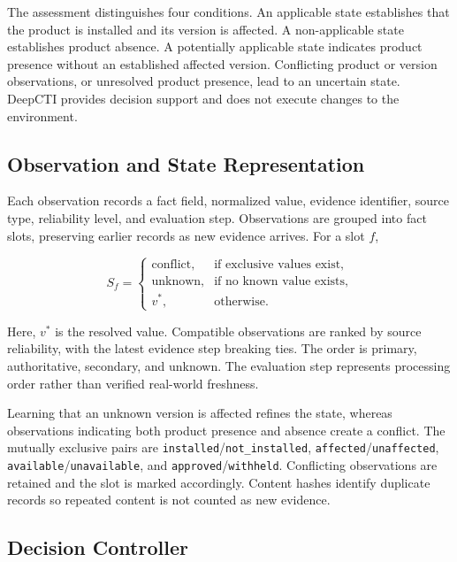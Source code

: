 \documentclass[conference]{IEEEtran}
\begin{document}
The assessment distinguishes four conditions. An applicable state
establishes that the product is installed and its version is affected.
A non-applicable state establishes product absence. A potentially
applicable state indicates product presence without an established
affected version. Conflicting product or version observations, or
unresolved product presence, lead to an uncertain state. DeepCTI
provides decision support and does not execute changes to the environment.

\subsection{Observation and State Representation}

Each observation records a fact field, normalized value, evidence
identifier, source type, reliability level, and evaluation step.
Observations are grouped into fact slots, preserving earlier records
as new evidence arrives. For a slot $f$,

\begin{equation}
S_f =
\begin{cases}
\text{conflict}, & \text{if exclusive values exist},\\
\text{unknown}, & \text{if no known value exists},\\
v^{*}, & \text{otherwise}.
\end{cases}
\label{eq:slot}
\end{equation}

Here, $v^{*}$ is the resolved value. Compatible observations are ranked
by source reliability, with the latest evidence step breaking ties.
The order is primary, authoritative, secondary, and unknown.
The evaluation step represents processing order rather than verified
real-world freshness.

Learning that an unknown version is affected refines the state,
whereas observations indicating both product presence and absence create
a conflict.
The mutually exclusive pairs are
\texttt{installed}/\texttt{not\_installed},
\texttt{affected}/\texttt{unaffected},
\texttt{available}/\texttt{unavailable}, and
\texttt{approved}/\texttt{withheld}. Conflicting observations are
retained and the slot is marked accordingly. Content hashes identify
duplicate records so repeated content is not counted as new evidence.

\subsection{Decision Controller}
\end{document}
